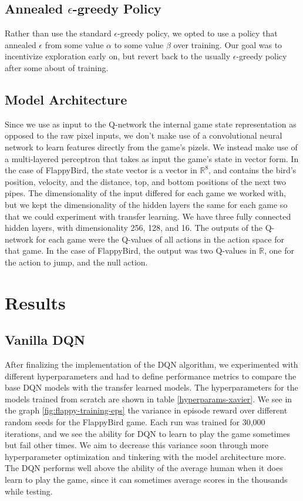 \documentclass{article}
\begin{document}
\subsection{Annealed $\epsilon$-greedy Policy}
Rather than use the standard $\epsilon$-greedy policy, we opted to use a policy that annealed $\epsilon$ from some value $\alpha$ to some value $\beta$ over training.
Our goal was to incentivize exploration early on, but revert back to the usually $\epsilon$-greedy policy after some about of training.


\subsection{Model Architecture}
Since we use as input to the Q-network the internal game state representation as opposed to the raw pixel inputs, we don't make use of a convolutional neural network to learn features directly from the game's pizels.
We instead make use of a multi-layered perceptron that takes as input the game's state in vector form.
In the case of FlappyBird, the state vector is a vector in $\mathbb{R}^8$, and contains the bird's position, velocity, and the distance, top, and bottom positions of the next two pipes.
The dimensionality of the input differed for each game we worked with, but we kept the dimensionality of the hidden layers the same for each game so that we could experiment with transfer learning.
We have three fully connected hidden layers, with dimensionality 256, 128, and 16.
The outputs of the Q-network for each game were the Q-values of all actions in the action space for that game.
In the case of FlappyBird, the output was two Q-values in $\mathbb{R}$, one for the action to jump, and the null action.

\section{Results}

\subsection{Vanilla DQN}
After finalizing the implementation of the DQN algorithm, we experimented with different hyperparameters and had to define performance metrics to compare the base DQN models with the transfer learned models. 
The hyperparameters for the models trained from scratch are shown in table \ref{hyperparams-xavier}.
We see in the graph \ref{fig:flappy-training-eps} the variance in episode reward over different random seeds for the FlappyBird game.
Each run was trained for 30,000 iterations, and we see the ability for DQN to learn to play the game sometimes but fail other times.
We aim to decrease this variance soon through more hyperparameter optimization and tinkering with the model architecture more.
The DQN performs well above the ability of the average human when it does learn to play the game, since it can sometimes average scores in the thousands while testing.
\end{document}
